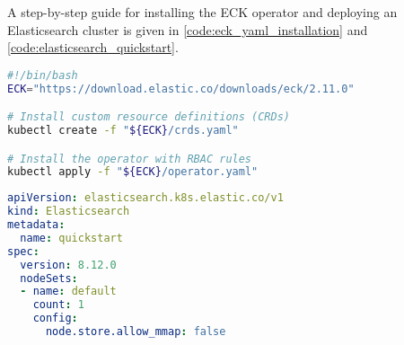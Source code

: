 \documentclass[../thesis.tex]{subfiles}
\begin{document}
A step-by-step guide for installing the \acrshort{ECK} operator and deploying an Elasticsearch cluster is given in \autoref{code:eck_yaml_installation} and \ref{code:elasticsearch_quickstart}.

\begin{lstlisting}[language=bash, captionpos=b, caption={[How to install ECK operator]Install ECK operator with its \acrshort{CRD}s and RBAC rules.}, label={code:eck_yaml_installation}]
#!/bin/bash
ECK="https://download.elastic.co/downloads/eck/2.11.0"

# Install custom resource definitions (CRDs)
kubectl create -f "${ECK}/crds.yaml"

# Install the operator with RBAC rules
kubectl apply -f "${ECK}/operator.yaml"
\end{lstlisting}

\begin{lstlisting}[language=yaml, captionpos=b, caption={[Elasticsearch quickstart deploy]Elasticsearch cluster specification to deploy one Elasticsearch node.}, label={code:elasticsearch_quickstart}]
apiVersion: elasticsearch.k8s.elastic.co/v1
kind: Elasticsearch
metadata:
  name: quickstart
spec:
  version: 8.12.0
  nodeSets:
  - name: default
    count: 1
    config:
      node.store.allow_mmap: false
\end{lstlisting}
\end{document}
